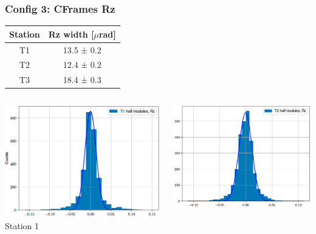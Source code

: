 \documentclass[aspectratio=1610, 12pt, xcolor=dvipsnames]{beamer}
\begin{document}
\begin{frame}\frametitle{Config 3: CFrames Rz}
  \begin{table}
    \begin{tabular}{c | c}
      \toprule
        Station & Rz width [$\mu$rad] \\
      \midrule
        T1 & 13.5 ± 0.2 \\
        T2 & 12.4 ± 0.2 \\
        T3 & 18.4 ± 0.3 \\
      \bottomrule
    \end{tabular}
  \end{table}
  \begin{columns}
    \begin{column}[c]{0.33\textwidth}
      \includegraphics[width=\textwidth]{plots/2025_plots_precision/T1_Rz.png}
      Station 1
    \end{column}
    \begin{column}[c]{0.33\textwidth}
      \includegraphics[width=\textwidth]{plots/2025_plots_precision/T2_Rz.png}

\end{column}
\end{columns}
\end{frame}
\end{document}
